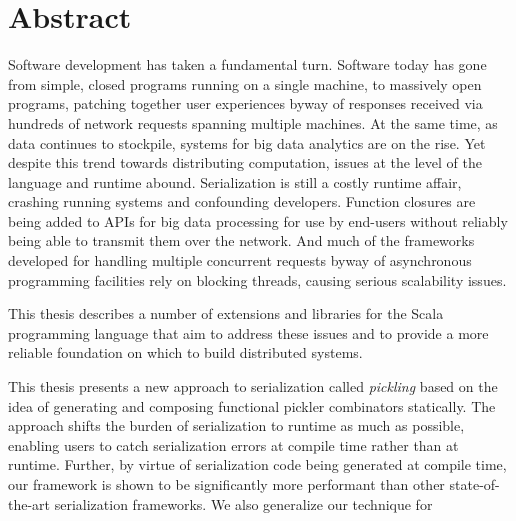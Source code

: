 

\cleardoublepage
\chapter*{Abstract}


Software development has taken a fundamental turn. Software today has gone from
simple, closed programs running on a single machine, to massively open programs,
patching together user experiences byway of responses received via hundreds of
network requests spanning multiple machines. At the same time, as data continues
to stockpile, systems for big data analytics are on the rise. Yet despite this
trend towards distributing computation, issues at the level of the language and
runtime abound. Serialization is still a costly runtime affair, crashing running
systems and confounding developers. Function closures are being added to APIs
for big data processing for use by end-users without reliably being able to
transmit them over the network. And much of the frameworks developed for
handling multiple concurrent requests byway of asynchronous programming
facilities rely on blocking threads, causing serious scalability issues.

\vspace{0.2cm}

This thesis describes a number of extensions and libraries for the Scala
programming language that aim to address these issues and to provide a more
reliable foundation on which to build distributed systems.

\vspace{0.2cm}

This thesis presents a new approach to serialization called {\em pickling} based
on the idea of generating and composing functional pickler combinators
statically. The approach shifts the burden of serialization to runtime as much
as possible, enabling users to catch serialization errors at compile time rather
than at runtime. Further, by virtue of serialization code being generated at
compile time, our framework is shown to be significantly more performant than
other state-of-the-art serialization frameworks. We also generalize our
technique for

\vspace{0.2cm}


